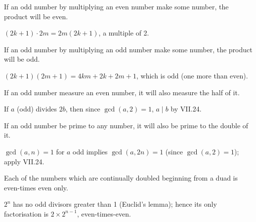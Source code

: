 \documentclass{rrxiv}
\begin{document}
\begin{claim}
\label{prop:IX.28}
If an odd number by multiplying an even number make some number, the
product will be even.
\end{claim}
\begin{evidence}[Proof of IX.28]
\label{ev:IX.28}
$(2k+1) \cdot 2m = 2 m(2k+1)$, a multiple of 2.
\end{evidence}

\begin{claim}
\label{prop:IX.29}
If an odd number by multiplying an odd number make some number, the
product will be odd.
\end{claim}
\begin{evidence}[Proof of IX.29]
\label{ev:IX.29}
$(2k+1)(2m+1) = 4km + 2k + 2m + 1$, which is odd (one more than even).
\end{evidence}

\begin{claim}
\label{prop:IX.30}
If an odd number measure an even number, it will also measure the
half of it.
\end{claim}
\begin{evidence}[Proof of IX.30]
\label{ev:IX.30}
If $a$ (odd) divides $2b$, then since $\gcd(a, 2) = 1$, $a \mid b$
by VII.24.
\end{evidence}

\begin{claim}
\label{prop:IX.31}
If an odd number be prime to any number, it will also be prime to
the double of it.
\end{claim}
\begin{evidence}[Proof of IX.31]
\label{ev:IX.31}
$\gcd(a, n) = 1$ for $a$ odd implies $\gcd(a, 2n) = 1$ (since
$\gcd(a, 2) = 1$); apply VII.24.
\end{evidence}

\begin{claim}
\label{prop:IX.32}
Each of the numbers which are continually doubled beginning from a
duad is even-times even only.
\end{claim}
\begin{evidence}[Proof of IX.32]
\label{ev:IX.32}
$2^n$ has no odd divisors greater than 1 (Euclid's lemma); hence its
only factorisation is $2 \times 2^{n-1}$, even-times-even.
\end{evidence}
\end{document}
